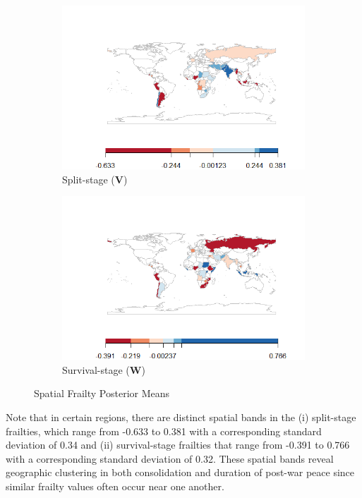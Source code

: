 \begin{figure}[!htb]
     \centering
     \begin{subfigure}[b]{0.495\textwidth}
         \centering
         \includegraphics[width=\textwidth]{figures/spatial_VmapNEW.png}
         \caption{Split-stage (\textbf{V})}
         \label{fig: V}
     \end{subfigure}
     \hfill
     \begin{subfigure}[b]{0.495\textwidth}
         \centering
         \includegraphics[width=\textwidth]{figures/spatial_WmapNEW.png}
         \caption{Survival-stage (\textbf{W})}
         \label{fig:W}
     \end{subfigure}
     \hfill
     \caption{Spatial Frailty Posterior Means}
        \label{figure5:choropleth maps}
\end{figure}

\noindent Note that in certain regions, there are distinct spatial bands in the (i) split-stage frailties, which range from -0.633 to 0.381 with a corresponding standard deviation of 0.34 and (ii) survival-stage frailties that range from -0.391 to 0.766 with a corresponding standard deviation of 0.32. These spatial bands reveal geographic clustering in both consolidation and duration of post-war peace since similar frailty values often occur near one another.


